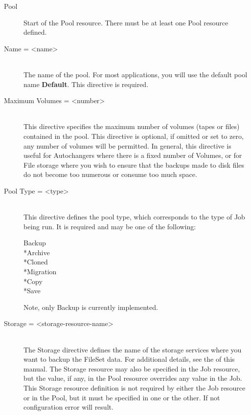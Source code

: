 \begin{description}
\item [Pool]
Start of the Pool resource.  There must be at least one Pool resource
defined.

\item [Name = {\textless}name{\textgreater}] \hfill \\
The name of the pool.  For most applications, you will use the default
pool name {\bf Default}.  This directive is required.

\label{MaxVolumes}
\item [Maximum Volumes = {\textless}number{\textgreater}] \hfill \\
This directive specifies the maximum number of volumes (tapes or files)
contained in the pool.  This directive is optional, if omitted or set to
zero, any number of volumes will be permitted.  In general, this
directive is useful for Autochangers where there is a fixed number of
Volumes, or for File storage where you wish to ensure that the backups
made to disk files do not become too numerous or consume too much space.

\item [Pool Type = {\textless}type{\textgreater}] \hfill \\
This directive defines the pool type, which corresponds to the type of
Job being run.  It is required and may be one of the following:

\begin{description}
  \item [Backup]
  \item [*Archive]
  \item [*Cloned]
  \item [*Migration]
  \item [*Copy]
  \item [*Save]
\end{description}
Note, only Backup is currently implemented.

\item [Storage = {\textless}storage-resource-name{\textgreater}] \hfill \\
The Storage directive defines the name of the storage services where you
want to backup the FileSet data.  For additional details, see the
 of this manual.
The Storage resource may also be specified in the Job resource,
but the value, if any, in the Pool resource overrides any value
in the Job. This Storage resource definition is not required by either
the Job resource or in the Pool, but it must be specified in
one or the other.  If not configuration error will result.


\end{description}
